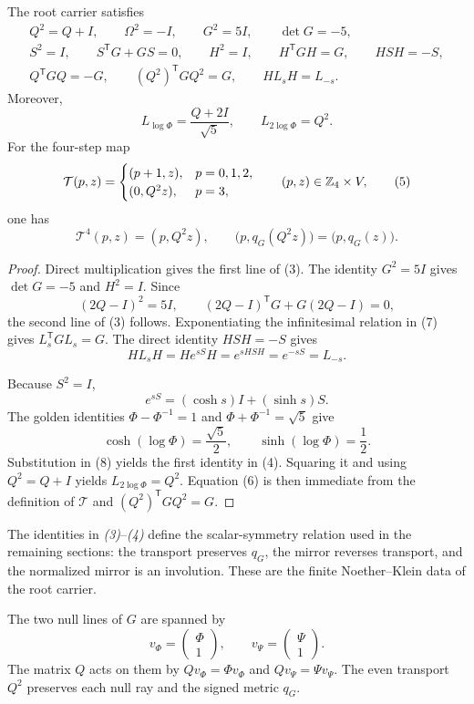 \begin{theorem}
The root carrier satisfies
\[
\begin{gathered}
Q^2=Q+I,\qquad \Omega^2=-I,\qquad G^2=5I,\qquad \det G=-5,\\
S^2=I,\qquad S^{\mathsf T}G+GS=0,\qquad H^2=I,\qquad
H^{\mathsf T}GH=G,\qquad HSH=-S,\\
Q^{\mathsf T}GQ=-G,\qquad
(Q^2)^{\mathsf T}GQ^2=G,\qquad
HL_sH=L_{-s}.
\end{gathered}
\tag{3}
\]
Moreover,
\[
L_{\log\Phi}=\frac{Q+2I}{\sqrt5},
\qquad
L_{2\log\Phi}=Q^2.
\tag{4}
\]
For the four-step map
\[
\mathcal T(p,z)=
\begin{cases}
(p+1,z),&p=0,1,2,\\
(0,Q^2z),&p=3,
\end{cases}
\qquad (p,z)\in\mathbb Z_4\times V,
\tag{5}
\]
one has
\[
\mathcal T^4(p,z)=(p,Q^2z),\qquad
\bigl(p,q_G(Q^2z)\bigr)=\bigl(p,q_G(z)\bigr).
\tag{6}
\]
\end{theorem}

\begin{proof}
Direct multiplication gives the first line of (3).  The identity
$G^2=5I$ gives $\det G=-5$ and $H^2=I$.  Since
\[
(2Q-I)^2=5I,\qquad
(2Q-I)^{\mathsf T}G+G(2Q-I)=0,
\tag{7}
\]
the second line of (3) follows.  Exponentiating the infinitesimal relation in
(7) gives $L_s^{\mathsf T}GL_s=G$.  The direct identity $HSH=-S$ gives
\[
HL_sH=He^{sS}H=e^{sHSH}=e^{-sS}=L_{-s}.
\]

Because $S^2=I$,
\[
e^{sS}=(\cosh s)I+(\sinh s)S.
\tag{8}
\]
The golden identities $\Phi-\Phi^{-1}=1$ and
$\Phi+\Phi^{-1}=\sqrt5$ give
\[
\cosh(\log\Phi)=\frac{\sqrt5}{2},\qquad
\sinh(\log\Phi)=\frac12.
\]
Substitution in (8) yields the first identity in (4).  Squaring it and using
$Q^2=Q+I$ yields $L_{2\log\Phi}=Q^2$.  Equation (6) is then immediate from
the definition of $\mathcal T$ and $(Q^2)^{\mathsf T}GQ^2=G$.
\end{proof}

The identities in \emph{(3)}--\emph{(4)} define the scalar-symmetry relation
used in the remaining sections: the transport preserves $q_G$, the mirror
reverses transport, and the normalized mirror is an involution.  These are the
finite Noether--Klein data of the root carrier.

\begin{corollary}
The two null lines of $G$ are spanned by
\[
v_\Phi=\begin{pmatrix}\Phi\\1\end{pmatrix},\qquad
v_\Psi=\begin{pmatrix}\Psi\\1\end{pmatrix}.
\tag{9}
\]
The matrix $Q$ acts on them by $Qv_\Phi=\Phi v_\Phi$ and
$Qv_\Psi=\Psi v_\Psi$.  The even transport $Q^2$ preserves each null ray and
the signed metric $q_G$.
\end{corollary}

